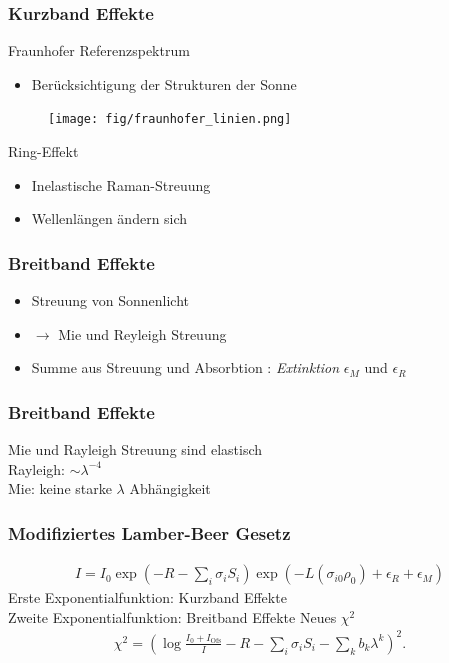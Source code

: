 \documentclass{beamer}
\begin{document}
\begin{frame}
    \frametitle{Kurzband Effekte}
Fraunhofer Referenzspektrum
    \begin{itemize}
        \item Berücksichtigung der Strukturen der Sonne
    \end{itemize}
    \begin{figure}[h]
        \texttt{[image: fig/fraunhofer\_linien.png]}
    \end{figure}
\pause
    Ring-Effekt
    \begin{itemize}
        \item Inelastische Raman-Streuung
        \item Wellenlängen ändern sich
    \end{itemize}
\end{frame}

\begin{frame}
    \frametitle{Breitband Effekte}
    \begin{itemize}
        \item Streuung von Sonnenlicht 
        \item $\to$ Mie und Reyleigh Streuung
        \item Summe aus Streuung und Absorbtion : \textit{Extinktion} $\epsilon_M$ und $\epsilon_R$
    \end{itemize}
\end{frame}

\begin{frame}
    \frametitle{Breitband Effekte}
    Mie und Rayleigh Streuung sind elastisch\\
    Rayleigh: $\sim \lambda^{-4}$\\
    Mie: keine starke $\lambda$ Abhängigkeit
\end{frame}

\begin{frame}
    \frametitle{Modifiziertes Lamber-Beer Gesetz}
    \begin{align}
        I = I_0 \exp(-R - \sum_i \sigma_i S_i) \exp (-L (\sigma_{i0}\rho_0) + \epsilon_R + \epsilon_M)
    \end{align}
    Erste Exponentialfunktion: Kurzband Effekte\\
    Zweite Exponentialfunktion: Breitband Effekte
    \pause
    Neues $\chi^2$
    \begin{align}
        \chi^2 = ( \log\frac{I_0 + I_\text{Ofs}}{I} - R - \sum_i \sigma_i S_i - \sum_k b_k \lambda^k )^2.
    \end{align}
\end{frame}
\end{document}

